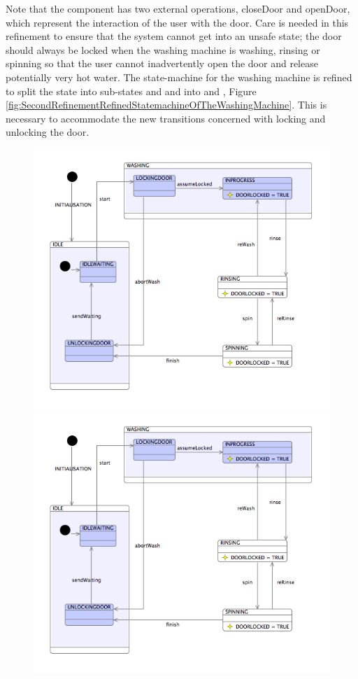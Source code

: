 Note that the   component has two external operations, closeDoor and openDoor, which represent the interaction of the user with the door. Care is needed in this refinement to ensure that the system cannot get into an unsafe state; the door should always be locked when the washing machine is washing, rinsing or spinning so that the user cannot inadvertently open the door and release potentially very hot water.
The state-machine for the washing machine is refined to split the   state into sub-states   and   and   into   and  , Figure \ref{fig:SecondRefinementRefinedStatemachineOfTheWashingMachine}. This is necessary to accommodate the new transitions concerned with locking and unlocking the door.
 
 \begin{figure}[!htbp]
  \centering
  \ifplastex
  \includegraphics[width=1024]{figures/image26.png}
  \else
  \includegraphics[width=1\textwidth]{figures/image26.png}

\end{figure}
